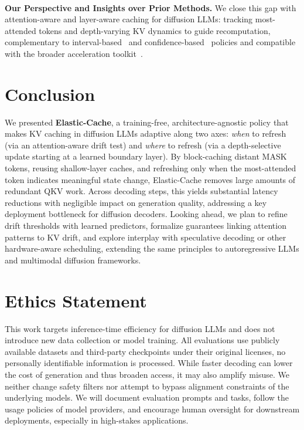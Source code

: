 \documentclass{article} %
\theoremstyle{definition}
\theoremstyle{remark}
\begin{document}
\\
{\bf Our Perspective and Insights over Prior Methods.}
We close this gap with attention-aware and layer-aware caching for diffusion LLMs: tracking most-attended tokens and depth-varying KV dynamics to guide recomputation, complementary to interval-based~\citep{ma2025dkv} and confidence-based~\citep{wu2025fast} policies and compatible with the broader acceleration toolkit~\citep{ainslie2023gqa,su2024roformer,touvron2023llama,touvron2023llama2,dubey2024llama,gu2017non,xiao2023surveynonautoregressivegenerationneural,arriola2025blockdiffusioninterpolatingautoregressive,chen2023fast,ramesh2025test,kou2024cllms}.


\vspace{-0.08in}
\section{Conclusion}
\vspace{-0.05in}

We presented {\bf Elastic-Cache}, a training-free, architecture-agnostic policy that makes KV caching in diffusion LLMs adaptive along two axes: {\em when} to refresh (via an attention-aware drift test) and {\em where} to refresh (via a depth-selective update starting at a learned boundary layer). By block-caching distant MASK tokens, reusing shallow-layer caches, and refreshing only when the most-attended token indicates meaningful state change, Elastic-Cache removes large amounts of redundant QKV work. Across decoding steps, this yields substantial latency reductions with negligible impact on generation quality, addressing a key deployment bottleneck for diffusion decoders. Looking ahead, we plan to refine drift thresholds with learned predictors, formalize guarantees linking attention patterns to KV drift, and explore interplay with speculative decoding or other hardware-aware scheduling, extending the same principles to autoregressive LLMs and multimodal diffusion frameworks.


\section*{Ethics Statement}
This work targets inference-time efficiency for diffusion LLMs and does not introduce new data collection or model training. All evaluations use publicly available datasets and third-party checkpoints under their original licenses, no personally identifiable information is processed. While faster decoding can lower the cost of generation and thus broaden access, it may also amplify misuse. We neither change safety filters nor attempt to bypass alignment constraints of the underlying models. We will document evaluation prompts and tasks, follow the usage policies of model providers, and encourage human oversight for downstream deployments, especially in high-stakes applications.
\end{document}

